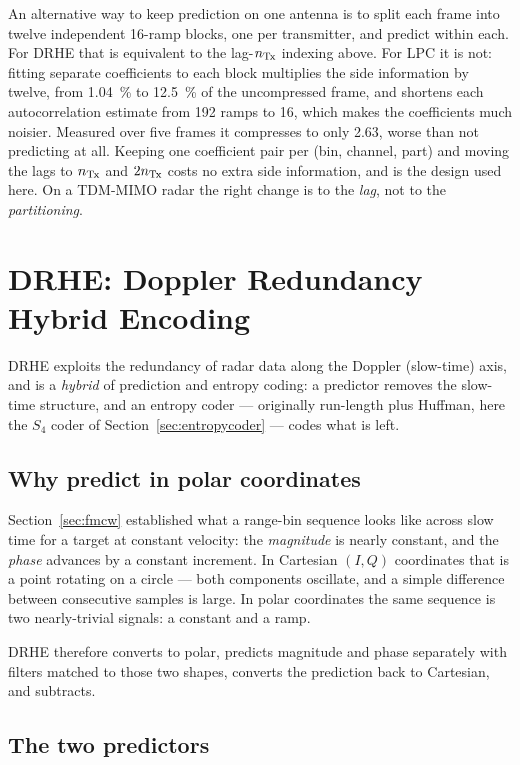 An alternative way to keep prediction on one antenna is to split each frame
into twelve independent 16-ramp blocks, one per transmitter, and predict within
each. For DRHE that is equivalent to the lag-$n_{\mathrm{Tx}}$ indexing above. For LPC it
is not: fitting separate coefficients to each block multiplies the side
information by twelve, from \SI{1.04}{\percent} to \SI{12.5}{\percent} of the
uncompressed frame, and shortens each autocorrelation estimate from 192 ramps
to 16, which makes the coefficients much noisier. Measured over five frames it
compresses to only \num{2.63}, worse than not predicting at all. Keeping one
coefficient pair per (bin, channel, part) and moving the lags to $n_{\mathrm{Tx}}$ and
$2n_{\mathrm{Tx}}$ costs no extra side information, and is the design used here. On a
TDM-MIMO radar the right change is to the \emph{lag}, not to the
\emph{partitioning}.

\section{DRHE: Doppler Redundancy Hybrid Encoding}
\label{sec:drhe}

DRHE \cite{li2014,zivkovic2015} exploits the redundancy of radar data along the
Doppler (slow-time) axis, and is a \emph{hybrid} of prediction and entropy
coding: a predictor removes the slow-time structure, and an entropy coder ---
originally run-length plus Huffman, here the $S_4$ coder of
Section~\ref{sec:entropycoder} --- codes what is left.

\subsection{Why predict in polar coordinates}

Section~\ref{sec:fmcw} established what a range-bin sequence looks like across
slow time for a target at constant velocity: the \emph{magnitude} is nearly
constant, and the \emph{phase} advances by a constant increment. In Cartesian
$(I,Q)$ coordinates that is a point rotating on a circle --- both components
oscillate, and a simple difference between consecutive samples is large. In
polar coordinates the same sequence is two nearly-trivial signals: a constant
and a ramp.

DRHE therefore converts to polar, predicts magnitude and phase separately with
filters matched to those two shapes, converts the prediction back to Cartesian,
and subtracts.

\subsection{The two predictors}

